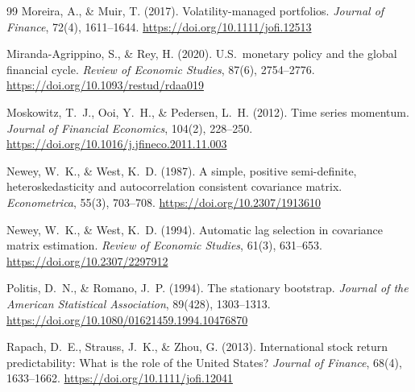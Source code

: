 \begin{thebibliography}{99}
Moreira, A., \& Muir, T. (2017). Volatility-managed portfolios. \textit{Journal of Finance}, 72(4), 1611--1644. \url{https://doi.org/10.1111/jofi.12513}

Miranda-Agrippino, S., \& Rey, H. (2020). U.S.\ monetary policy and the global financial cycle. \textit{Review of Economic Studies}, 87(6), 2754--2776. \url{https://doi.org/10.1093/restud/rdaa019}

Moskowitz, T.~J., Ooi, Y.~H., \& Pedersen, L.~H. (2012). Time series momentum. \textit{Journal of Financial Economics}, 104(2), 228--250. \url{https://doi.org/10.1016/j.jfineco.2011.11.003}

Newey, W.~K., \& West, K.~D. (1987). A simple, positive semi-definite, heteroskedasticity and autocorrelation consistent covariance matrix. \textit{Econometrica}, 55(3), 703--708. \url{https://doi.org/10.2307/1913610}

Newey, W.~K., \& West, K.~D. (1994). Automatic lag selection in covariance matrix estimation. \textit{Review of Economic Studies}, 61(3), 631--653. \url{https://doi.org/10.2307/2297912}

Politis, D.~N., \& Romano, J.~P. (1994). The stationary bootstrap. \textit{Journal of the American Statistical Association}, 89(428), 1303--1313. \url{https://doi.org/10.1080/01621459.1994.10476870}

Rapach, D.~E., Strauss, J.~K., \& Zhou, G. (2013). International stock return predictability: What is the role of the United States? \textit{Journal of Finance}, 68(4), 1633--1662. \url{https://doi.org/10.1111/jofi.12041}

\end{thebibliography}

